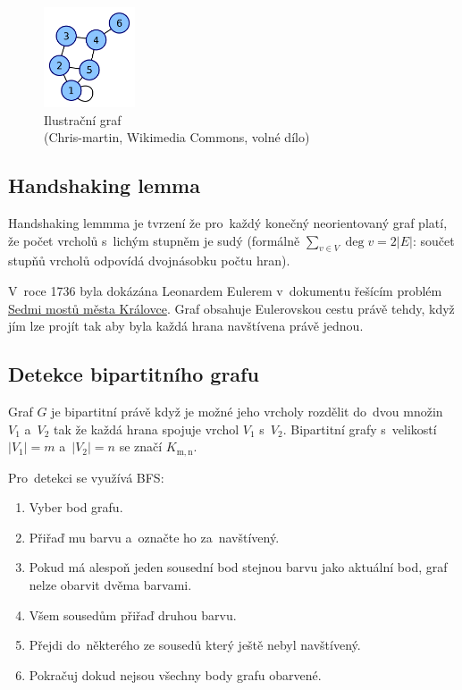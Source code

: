 \begin{figure}[ht]
\centering
\includegraphics[height=8em]{images/3_graf-matice-souslednosti}

\caption[Ilustrační graf]{Ilustrační graf\\{\small (Chris-martin, Wikimedia Commons, volné dílo)}}
\label{ilustracni-graf-matice}
\end{figure}

\subsection{Handshaking lemma}

Handshaking lemmma je tvrzení že pro~každý konečný neorientovaný graf platí, že počet vrcholů s~lichým stupněm je sudý (formálně $\sum_{v \in V} \deg v = 2 |E|$: součet stupňů vrcholů odpovídá dvojnásobku počtu hran).

V~roce 1736 byla dokázána Leonardem Eulerem v~dokumentu řešícím problém \href{https://cs.wikipedia.org/wiki/Sedm_most%C5%AF_m%C4%9Bsta_Kr%C3%A1lovce}{Sedmi mostů města Královce}.
Graf obsahuje Eulerovskou cestu právě tehdy, když jím lze projít tak aby byla každá hrana navštívena právě jednou.

\subsection{Detekce bipartitního grafu}

Graf $G$ je bipartitní právě když je možné jeho vrcholy rozdělit do~dvou množin $V_1$ a~$V_2$ tak že každá hrana spojuje vrchol $V_1$ s~$V_2$.
Bipartitní grafy s~velikostí $|V_1|=m$ a~$|V_2|=n$ se značí $K_\mathrm{m,n}$.

Pro~detekci se využívá BFS:

\begin{enumerate}
\item Vyber bod grafu.
\item Přiřaď mu barvu a~označte ho za~navštívený.
\item Pokud má alespoň jeden sousední bod stejnou barvu jako aktuální bod, graf nelze obarvit dvěma barvami.
\item Všem sousedům přiřaď druhou barvu.
\item Přejdi do~některého ze sousedů který ještě nebyl navštívený.
\item Pokračuj dokud nejsou všechny body grafu obarvené.
\end{enumerate}


